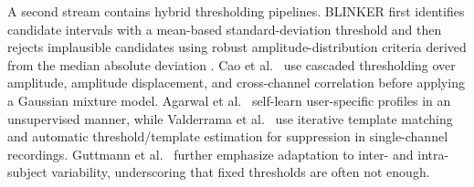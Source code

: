 A second stream contains hybrid thresholding pipelines. BLINKER first identifies candidate intervals with a mean-based standard-deviation threshold and then rejects implausible candidates using robust amplitude-distribution criteria derived from the median absolute deviation \citep{kleifges2017blinker}. Cao et al.~\citep{cao2021unsupervised} use cascaded thresholding over amplitude, amplitude displacement, and cross-channel correlation before applying a Gaussian mixture model. Agarwal et al.~\citep{agarwal2019blink} self-learn user-specific profiles in an unsupervised manner, while Valderrama et al.~\citep{valderrama2018automatic} use iterative template matching and automatic threshold/template estimation for suppression in single-channel recordings. Guttmann et al.~\citep{guttmann2019new} further emphasize adaptation to inter- and intra-subject variability, underscoring that fixed thresholds are often not enough.





